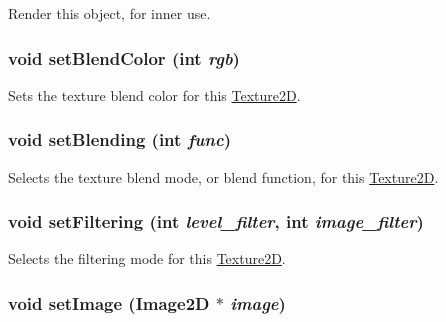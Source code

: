 Render this object, for inner use. \hypertarget{classm3g_1_1Texture2D_b5a6333203f443fb1f66ea2e39d4de1b}{
\subsubsection[{setBlendColor}]{\setlength{\rightskip}{0pt plus 5cm}void setBlendColor (int {\em rgb})}}
\label{classm3g_1_1Texture2D_b5a6333203f443fb1f66ea2e39d4de1b}


Sets the texture blend color for this \hyperlink{classm3g_1_1Texture2D}{Texture2D}. \hypertarget{classm3g_1_1Texture2D_189d98ce3e8ac7590be771944b3186d4}{
\subsubsection[{setBlending}]{\setlength{\rightskip}{0pt plus 5cm}void setBlending (int {\em func})}}
\label{classm3g_1_1Texture2D_189d98ce3e8ac7590be771944b3186d4}


Selects the texture blend mode, or blend function, for this \hyperlink{classm3g_1_1Texture2D}{Texture2D}. \hypertarget{classm3g_1_1Texture2D_857574b5c0f3e0ca9239bafb4008cae1}{
\subsubsection[{setFiltering}]{\setlength{\rightskip}{0pt plus 5cm}void setFiltering (int {\em level\_\-filter}, \/  int {\em image\_\-filter})}}
\label{classm3g_1_1Texture2D_857574b5c0f3e0ca9239bafb4008cae1}


Selects the filtering mode for this \hyperlink{classm3g_1_1Texture2D}{Texture2D}. \hypertarget{classm3g_1_1Texture2D_705b89b41cd1b38f664ed912be44baaa}{
\subsubsection[{setImage}]{\setlength{\rightskip}{0pt plus 5cm}void setImage ({\bf Image2D} $\ast$ {\em image})}}
\label{classm3g_1_1Texture2D_705b89b41cd1b38f664ed912be44baaa}


